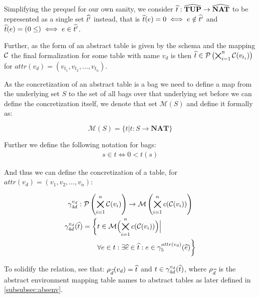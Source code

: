 Simplifying the prequel for our own sanity, we consider $\widehat{t} : \widehat{\mathbf{TUP}} \rightarrow \widehat{\mathbf{NAT}}$ to be represented as a single set $\widehat{t'}$ instead, that is $\widehat{t}({e}) = 0 \iff e \notin \widehat{t'}$ and  $\widehat{t}({e}) = (0 \leq) \iff e \in \widehat{t'}$.

Further, as the form of an abstract table is given by the schema and the mapping $\mathcal{C}$ the final formalization for some table with name $v_d$ is then $\widehat{t} \in \mathcal{P}\left(\bigtimes_{i = 1}^{n}\mathcal{C}(v_{t_i})\right)$ for $attr(v_d) = (v_{t_1}, v_{t_2}, \dots, v_{t_n})$.

As the concretization of an abstract table is a bag we need to define a map from the underlying set $S$ to the set of all bags over that underlying set before we can define the concretization itself, we denote that set $\mathcal{M}(S)$ and define it formally as:


\begin{equation}
    \mathcal{M}(S) = \{t | t : S \rightarrow \mathbf{NAT}\}\label{eq:equation-nums}
\end{equation}

Further we define the following notation for bags:
\begin{align}
    s \in t \iff 0 < t(s)
\end{align}

And thus we can define the concretization of a table, for $attr(v_d) = (v_1, v_2, \dots, v_n)$:


\begin{gather}
    \gamma^{v_d}_{4d} : \mathcal{P}\left(\bigtimes_{i = 1}^{n}\mathcal{C}(v_i)\right) \rightarrow \mathcal{M}\left(\bigtimes_{i = 1}^n c(\mathcal{C}(v_i))\right)\\
    \begin{split}
        \gamma^{v_d}_{4d}(\widehat{t}) = \biggl\{ &t \in \mathcal{M}\Bigl(\bigtimes_{i = 1}^n c(\mathcal{C}(v_i))\Bigr) \Big|\\
        &\forall e \in t : \exists \widehat{e} \in \widehat{t} : e \in \gamma^{attr(v_d)}_5(\widehat{e}) \biggr\}
    \end{split}
\end{gather}

To solidify the relation, see that: $\rho_{\widehat{d}}(v_d) = \widehat{t}$ and $t \in \gamma_{4d}^{v_d}(\widehat{t})$, where $\rho_{\widehat{d}}$ is the abstract environment mapping table names to abstract tables as later defined in \autoref{subsubsec:absenv}.

